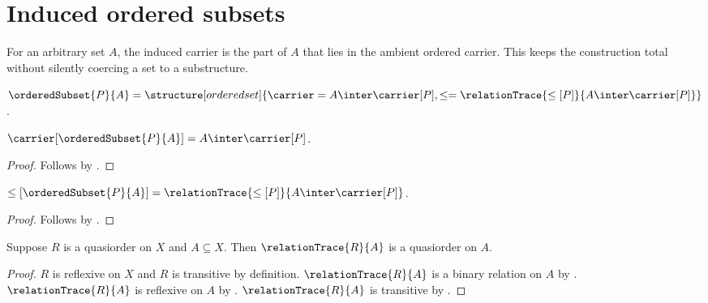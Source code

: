 \section{Induced ordered subsets}




For an arbitrary set $A$, the induced carrier is the part of $A$ that lies in
the ambient ordered carrier.  This keeps the construction total without
silently coercing a set to a substructure.

\begin{definition}\label{ordered_subset}
    $\orderedSubset{P}{A}=
        \structure[ordered set]{
            \carrier=A\inter\carrier[P],
            \leq=\relationTrace{\leq[P]}
                {A\inter\carrier[P]}
        }$.
\end{definition}

\begin{proposition}\label{ordered_subset_carrier}
    $\carrier[\orderedSubset{P}{A}]=A\inter\carrier[P]$.
\end{proposition}
\begin{proof}
    Follows by
        .
\end{proof}

\begin{proposition}\label{ordered_subset_order}
    $\leq[\orderedSubset{P}{A}]=
        \relationTrace{\leq[P]}{A\inter\carrier[P]}$.
\end{proposition}
\begin{proof}
    Follows by
        .
\end{proof}

\begin{proposition}\label{relation_trace_quasiorder_on}
    Suppose $R$ is a quasiorder on $X$ and $A\subseteq X$.
    Then $\relationTrace{R}{A}$ is a quasiorder on $A$.
\end{proposition}
\begin{proof}
    $R$ is reflexive on $X$ and $R$ is transitive by
        definition.
    $\relationTrace{R}{A}$ is a binary relation on $A$ by
        .
    $\relationTrace{R}{A}$ is reflexive on $A$ by
        .
    $\relationTrace{R}{A}$ is transitive by
        .
\end{proof}

